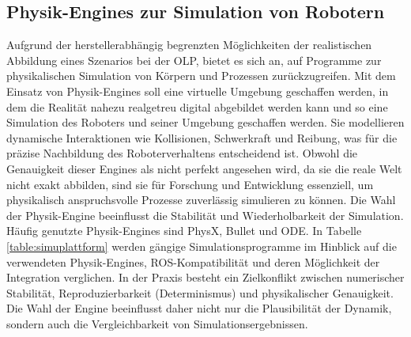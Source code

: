\subsection{Physik-Engines zur Simulation von Robotern}
Aufgrund der herstellerabhängig begrenzten Möglichkeiten der
realistischen Abbildung eines Szenarios bei der OLP, bietet es sich
an, auf Programme zur physikalischen Simulation von Körpern und Prozessen
zurückzugreifen. Mit dem Einsatz von
Physik-Engines soll eine virtuelle Umgebung geschaffen werden, in
dem die Realität nahezu realgetreu digital abgebildet werden kann
und so eine Simulation des Roboters und seiner Umgebung
geschaffen werden. Sie modellieren dynamische Interaktionen wie Kollisionen,
Schwerkraft und Reibung, was für die präzise Nachbildung des Roboterverhaltens
entscheidend ist. Obwohl die Genauigkeit dieser Engines als nicht perfekt
angesehen wird, da sie die reale Welt nicht exakt
abbilden, sind sie für
Forschung und Entwicklung essenziell, um physikalisch anspruchsvolle Prozesse
zuverlässig simulieren zu können. Die Wahl der Physik-Engine
beeinflusst die Stabilität und Wiederholbarkeit der
Simulation. Häufig genutzte Physik-Engines sind PhysX, Bullet und
ODE. In Tabelle \ref{table:simuplattform} werden gängige
Simulationsprogramme im Hinblick auf die verwendeten Physik-Engines,
ROS-Kompatibilität und deren Möglichkeit der Integration verglichen.
In der Praxis besteht ein Zielkonflikt zwischen numerischer Stabilität,
Reproduzierbarkeit (Determinismus) und physikalischer Genauigkeit. Die Wahl der
Engine beeinflusst daher nicht nur die Plausibilität der Dynamik, sondern auch
die Vergleichbarkeit von Simulationsergebnissen.


